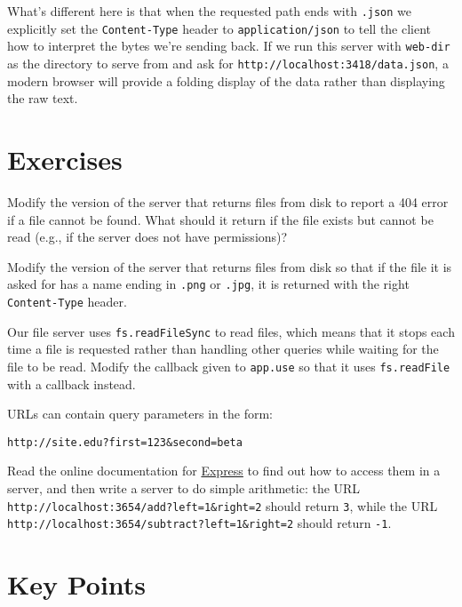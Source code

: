 What's different here is that when the requested path ends with \texttt{.json}
we explicitly set the \texttt{Content-Type} header to \texttt{application/json}
to tell the client how to interpret the bytes we're sending back.
If we run this server with \texttt{web-dir} as the directory to serve from
and ask for \texttt{http://localhost:3418/data.json},
a modern browser will provide a folding display of the data
rather than displaying the raw text.

\section{Exercises}\label{s:server-exercises}


Modify the version of the server that returns files from disk
to report a 404 error if a file cannot be found.
What should it return if the file exists but cannot be read
(e.g., if the server does not have permissions)?


Modify the version of the server that returns files from disk
so that if the file it is asked for has a name ending in \texttt{.png} or \texttt{.jpg},
it is returned with the right \texttt{Content-Type} header.


Our file server uses \texttt{fs.readFileSync} to read files,
which means that it stops each time a file is requested
rather than handling other queries while waiting for the file to be read.
Modify the callback given to \texttt{app.use} so that it uses \texttt{fs.readFile} with a callback instead.


URLs can contain query parameters in the form:

\begin{verbatim}
http://site.edu?first=123&second=beta
\end{verbatim}

\noindent
Read the online documentation for \href{https://expressjs.org/}{Express} to find out
how to access them in a server,
and then write a server to do simple arithmetic:
the URL \texttt{http://localhost:3654/add?left=1\&right=2} should return \texttt{3},
while the URL \texttt{http://localhost:3654/subtract?left=1\&right=2} should return \texttt{-1}.

\section*{Key Points}


